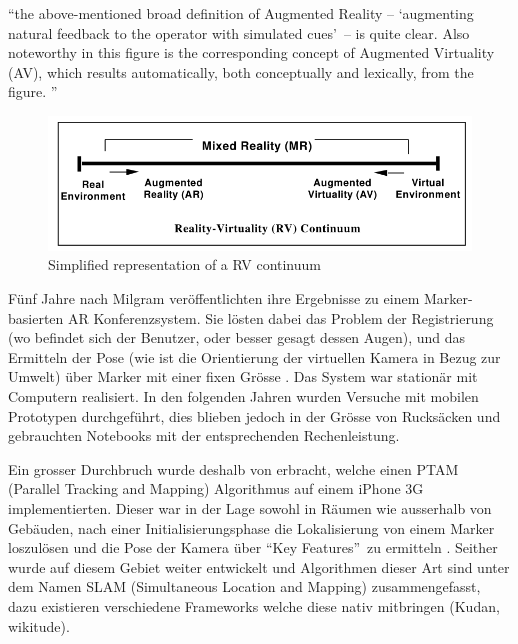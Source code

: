 \documentclass[a4paper]{scrreprt}
\begin{document}
\vspace{1em}

\textquotedblleft the above-mentioned broad definition of Augmented Reality –  \textquoteleft augmenting natural feedback to the operator with simulated cues\textquoteright\ – is quite clear. Also noteworthy in this figure is the corresponding concept of Augmented Virtuality (AV), which results automatically, both conceptually and lexically, from the figure. \textquotedblright\ \parencite{Milgram1994}

\begin{figure}[htb]
	\includegraphics[keepaspectratio, width=\textwidth]{MR_milgram.png}
	\caption{Simplified representation of a RV continuum \parencite{Milgram1994}}
	\label{fig:RVContiinum}
\end{figure}



Fünf Jahre nach Milgram veröffentlichten \citeauthor{Kato1999} ihre Ergebnisse zu einem Marker-basierten AR Konferenzsystem. Sie lösten dabei das Problem der Registrierung (wo befindet sich der Benutzer, oder besser gesagt dessen Augen), und das Ermitteln der Pose (wie ist die Orientierung der virtuellen Kamera in Bezug zur Umwelt) über Marker mit einer fixen Grösse \parencite{Kato1999}. Das System war stationär mit Computern realisiert. In den folgenden Jahren wurden Versuche mit  mobilen Prototypen durchgeführt, dies blieben jedoch in der Grösse von Rucksäcken und gebrauchten Notebooks mit der entsprechenden Rechenleistung.

Ein grosser Durchbruch wurde deshalb von \citeauthor{Klein2009} erbracht, welche einen PTAM (Parallel Tracking and Mapping) Algorithmus auf einem iPhone 3G implementierten. Dieser war in der Lage sowohl in Räumen wie ausserhalb von Gebäuden, nach einer Initialisierungsphase die Lokalisierung von einem Marker loszulösen und die Pose der Kamera über \textquotedblleft Key Features\textquotedblright\ zu ermitteln \parencite{Klein2009}. Seither wurde auf diesem Gebiet weiter entwickelt und Algorithmen dieser Art sind unter dem Namen SLAM (Simultaneous Location and Mapping) zusammengefasst, dazu existieren verschiedene Frameworks welche diese nativ mitbringen (Kudan, wikitude).
\end{document}
